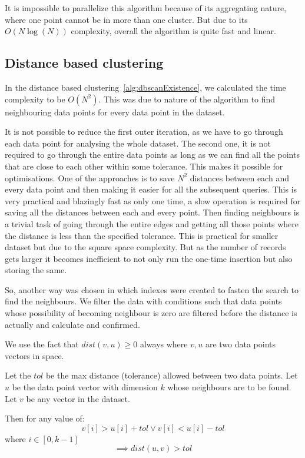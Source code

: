 It is impossible to parallelize this algorithm because of its aggregating nature, where one point cannot be in more than one cluster. But due to its \(O(N\log(N))\) complexity, overall the algorithm is quite fast and linear.

\subsection{Distance based clustering}

In the distance based clustering~\ref{alg:dbscanExistence}, we calculated the time complexity to be \(O(N^2)\). This was due to nature of the algorithm to find neighbouring data points for every data point in the dataset. 

It is not possible to reduce the first outer iteration, as we have to go through each data point for analysing the whole dataset. The second one, it is not required to go through the entire data points as long as we can find all the points that are close to each other within some tolerance. This makes it possible for optimisations. One of the approaches is to save \(N^2\) distances between each and every data point and then making it easier for all the subsequent queries. This is very practical and blazingly fast as only one time, a slow operation is required for saving all the distances between each and every point. Then finding neighbours is a trivial task of going through the entire edges and getting all those points where the distance is less than the specified tolerance. This is practical for smaller dataset but due to the square space complexity. But as the number of records gets larger it becomes inefficient to not only run the one-time insertion but also storing the same.

So, another way was chosen in which indexes were created to fasten the search to find the neighbours. We filter the data with conditions such that data points whose possibility of becoming neighbour is zero are filtered before the distance is actually and calculate and confirmed.

We use the fact that \(dist(v, u) \geq 0\) always where \(v, u\) are two data points vectors in space. 

Let the \(tol\) be the max distance (tolerance) allowed between two data points. 
Let \(u\) be the data point vector with dimension \(k\) whose neighbours are to be found.
Let \(v\) be any vector in the dataset.

Then for any value of:
\[v[i] > u[i] + tol \vee v[i] < u[i] - tol\] where \(i \in [0, k-1]\)
\[\implies dist(u, v) > tol\]


